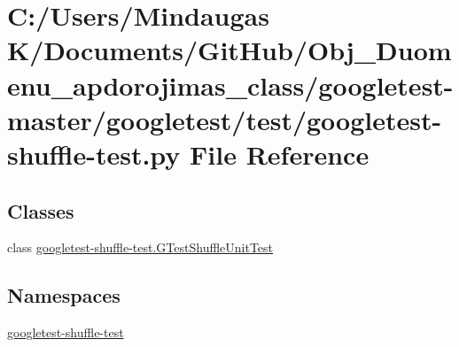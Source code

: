 \hypertarget{googletest-master_2googletest_2test_2googletest-shuffle-test_8py}{}\section{C\+:/\+Users/\+Mindaugas K/\+Documents/\+Git\+Hub/\+Obj\+\_\+\+Duomenu\+\_\+apdorojimas\+\_\+class/googletest-\/master/googletest/test/googletest-\/shuffle-\/test.py File Reference}
\label{googletest-master_2googletest_2test_2googletest-shuffle-test_8py}
\subsection*{Classes}
\begin{DoxyCompactItemize}
\item 
class \mbox{\hyperlink{classgoogletest-shuffle-test_1_1_g_test_shuffle_unit_test}{googletest-\/shuffle-\/test.\+G\+Test\+Shuffle\+Unit\+Test}}
\end{DoxyCompactItemize}
\subsection*{Namespaces}
\begin{DoxyCompactItemize}
\item 
 \mbox{\hyperlink{namespacegoogletest-shuffle-test}{googletest-\/shuffle-\/test}}
\end{DoxyCompactItemize}
